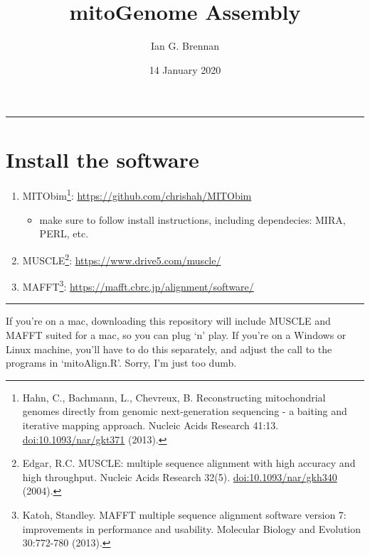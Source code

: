 \documentclass[]{article}
\title{mitoGenome Assembly}
\author{Ian G. Brennan}
\date{14 January 2020}
\providecommand{\tightlist}{%
  \setlength{\itemsep}{0pt}\setlength{\parskip}{0pt}}
\let\rmarkdownfootnote\footnote%
\def\footnote{\protect\rmarkdownfootnote}
\renewcommand{\linethickness}{0.05em}
\begin{document}
\maketitle

{
\setcounter{tocdepth}{2}
\tableofcontents
}
\begin{center}\rule{0.5\linewidth}{\linethickness}\end{center}

\pagebreak

\hypertarget{install-the-software}{%
\section{Install the software}\label{install-the-software}}

\begin{enumerate}
\def\labelenumi{\arabic{enumi}.}
\tightlist
\item
  MITObim\footnote{Hahn, C., Bachmann, L., Chevreux, B. Reconstructing
    mitochondrial genomes directly from genomic next-generation
    sequencing - a baiting and iterative mapping approach. Nucleic Acids
    Research 41:13. \url{doi:10.1093/nar/gkt371} (2013).}:
  \url{https://github.com/chrishah/MITObim}

  \begin{itemize}
  \tightlist
  \item
    make sure to follow install instructions, including dependecies:
    MIRA, PERL, etc.
  \end{itemize}
\item
  MUSCLE\footnote{Edgar, R.C. MUSCLE: multiple sequence alignment with
    high accuracy and high throughput. Nucleic Acids Research 32(5).
    \url{doi:10.1093/nar/gkh340} (2004).}:
  \url{https://www.drive5.com/muscle/}
\item
  MAFFT\footnote{Katoh, Standley. MAFFT multiple sequence alignment
    software version 7: improvements in performance and usability.
    Molecular Biology and Evolution 30:772-780 (2013).}:
  \url{https://mafft.cbrc.jp/alignment/software/}
\end{enumerate}

\begin{center}\rule{0.5\linewidth}{\linethickness}\end{center}

If you're on a mac, downloading this repository will include MUSCLE and
MAFFT suited for a mac, so you can plug `n' play. If you're on a Windows
or Linux machine, you'll have to do this separately, and adjust the call
to the programs in `mitoAlign.R'. Sorry, I'm just too dumb.
\end{document}

